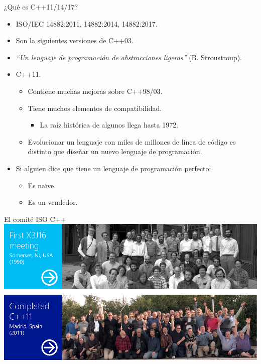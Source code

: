 \begin{frame}{¿Qué es C++11/14/17?}
\begin{itemize}
  \item \pause ISO/IEC 14882:2011, 14882:2014, 14882:2017.
  \item \pause Son la siguientes versiones de C++03.
  \item \pause \emph{``Un lenguaje de programación de abstracciones ligeras''} (B. Stroustroup).
  \item \pause C++11.
    \begin{itemize}
      \item Contiene muchas mejoras sobre C++98/03.
      \item Tiene muchos elementos de compatibilidad.
        \begin{itemize}
          \item La raíz histórica de algunos llega hasta 1972.
        \end{itemize}
      \item Evolucionar un lenguaje con miles de millones de línea de código es
      distinto que diseñar un nuevo lenguaje de programación.
    \end{itemize}
  \item \pause Si alguien dice que tiene un lenguaje de programación perfecto:
    \begin{itemize}
      \item Es na\"{i}ve.
      \item Es un vendedor.
    \end{itemize}
\end{itemize}
\end{frame}


\begin{frame}[t]{El comité ISO C++}
\includegraphics[width=\textwidth]{img/wg21-1990-2011.png}
\end{frame}

